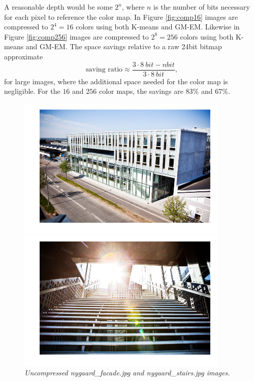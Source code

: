 \documentclass[a4paper,10pt,article,oneside,english]{memoir}
\let\oldcaption\caption
\renewcommand{\caption}[1]{\oldcaption{\emph{#1}}}
\begin{document}
A reasonable depth would be some $2^n$, where $n$ is the number of bits necessary for each pixel to reference the color map. In Figure \ref{fig:comp16} images are compressed to $2^4=16$ colors using both K-means and GM-EM. Likewise in Figure \ref{fig:comp256} images are compressed to $2^8=256$ colors using both K-means and GM-EM. The space savings relative to a raw 24bit bitmap approximate 
$$\text{saving ratio} \approx \frac{3 \cdot \SI{8}{bit}- n \si{bit}}{3 \cdot\SI{8}{bit}},$$
for large images, where the additional space needed for the color map is negligible. For the $16$ and $256$ color maps, the savings are $83\%$ and $67\%$. 

\begin{figure}
	\centering
	\begin{minipage}{.49\textwidth}
		\includegraphics[width=\textwidth]{nygaard_facade_org.png}
	\end{minipage}
	\hfill
	\begin{minipage}{.49\textwidth}
		\includegraphics[width=\textwidth]{nygaard_stairs_org.png}
	\end{minipage}
	\caption{Uncompressed \emph{nygaard\_facade.jpg} and \emph{nygaard\_stairs.jpg} images.}
	\label{fig:uncomp}
\end{figure}
\end{document}
